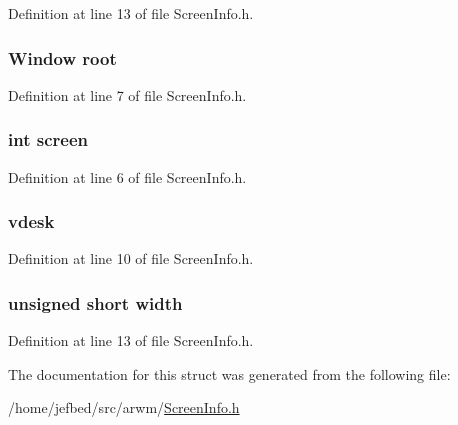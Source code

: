Definition at line 13 of file ScreenInfo.h.

\hypertarget{struct_screen_info_a67efd2aa4387dcb1b33df1f044512a16}{
\subsubsection[{root}]{\setlength{\rightskip}{0pt plus 5cm}Window {\bf root}}}
\label{struct_screen_info_a67efd2aa4387dcb1b33df1f044512a16}


Definition at line 7 of file ScreenInfo.h.

\hypertarget{struct_screen_info_a3109b0889cec9f0de874a2bdc1f84372}{
\subsubsection[{screen}]{\setlength{\rightskip}{0pt plus 5cm}int {\bf screen}}}
\label{struct_screen_info_a3109b0889cec9f0de874a2bdc1f84372}


Definition at line 6 of file ScreenInfo.h.

\hypertarget{struct_screen_info_ac261b53c2ef43b8fb701497822972797}{
\subsubsection[{vdesk}]{ {\bf vdesk}}}
\label{struct_screen_info_ac261b53c2ef43b8fb701497822972797}


Definition at line 10 of file ScreenInfo.h.

\hypertarget{struct_screen_info_a8a31e3e5c2765d45488c75c00bacfefd}{
\subsubsection[{width}]{\setlength{\rightskip}{0pt plus 5cm}unsigned short {\bf width}}}
\label{struct_screen_info_a8a31e3e5c2765d45488c75c00bacfefd}


Definition at line 13 of file ScreenInfo.h.



The documentation for this struct was generated from the following file:\begin{DoxyCompactItemize}
\item 
/home/jefbed/src/arwm/\hyperlink{_screen_info_8h}{ScreenInfo.h}\end{DoxyCompactItemize}
